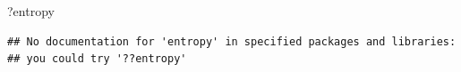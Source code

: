 \documentclass[
]{article}
\newenvironment{Shaded}{\begin{snugshade}}{\end{snugshade}}
\newcommand{\NormalTok}[1]{#1}
\begin{document}
\begin{Shaded}
\begin{Highlighting}[]
\NormalTok{?entropy}
\end{Highlighting}
\end{Shaded}

\begin{verbatim}
## No documentation for 'entropy' in specified packages and libraries:
## you could try '??entropy'
\end{verbatim}
\end{document}
